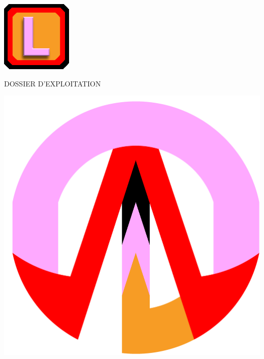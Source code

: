 \documentclass{article}
\begin{document}
\begin{centering}


\includegraphics[scale = 10]{Emploi.png}


\quad

\quad

\LARGE{DOSSIER D'EXPLOITATION}


\quad

\quad

\includegraphics[scale = 0.07]{Logo.png}

\end{centering}
\end{document}
